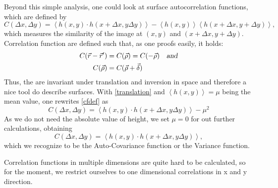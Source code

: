 \documentclass[11pt,a4paper]{article}
\begin{document}
Beyond this simple analysis, one could look at surface autocorrelation functions, which are defined by
\begin{equation}\label{cfdef}
	C(\Delta x,\Delta y)=\left\langle h(x,y)\cdot h(x+\Delta x,y\Delta y) \right\rangle-\left\langle h(x,y) \right\rangle\left\langle h(x+\Delta x,y+\Delta y) \right\rangle,
\end{equation}
which measures the similarity of the image at $(x,y)$ and $(x+\Delta x,y+\Delta y)$. Correlation function are defined such that, as one proofs easily, it holds:
\begin{align}
	C(\vec r - \vec r') &= C(\vec\rho) =C (-\vec\rho) \quad\textsl{and}\\
	C(\vec\rho) &= C(\vec\rho+\vec\delta)\label{translation}
\end{align}
Thus, the are invariant under translation and inversion in space and therefore a nice tool do describe surfaces. With \eqref{translation} and $\left\langle h(x,y) \right\rangle=\mu$ being the mean value, one rewrites \eqref{cfdef} as
\begin{equation}
	C(\Delta x,\Delta y)=\left\langle h(x,y)\cdot h(x+\Delta x,y\Delta y) \right\rangle-\mu^2
\end{equation}
As we do not need the absolute value of height, we set $\mu=0$ for out further calculations, obtaining
\begin{equation}
	C(\Delta x,\Delta y)=\left\langle h(x,y)\cdot h(x+\Delta x,y\Delta y) \right\rangle\label{cfreal},
\end{equation}
which we recognize to be the Auto-Covariance function or the Variance function.

Correlation functions in multiple dimensions are quite hard to be calculated, so for the moment, we restrict ourselves to one dimensional correlations in x and y direction.
\end{document}
